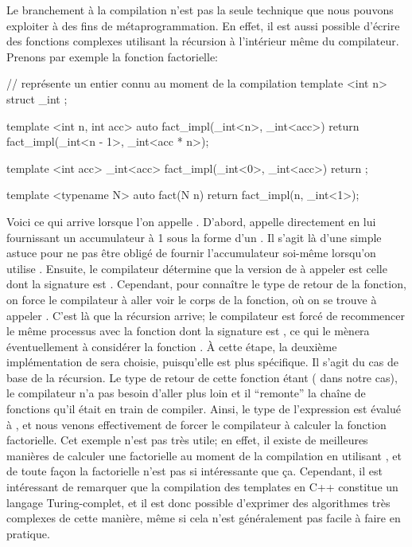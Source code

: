 Le branchement à la compilation n'est pas la seule technique que nous pouvons
exploiter à des fins de métaprogrammation. En effet, il est aussi possible
d'écrire des fonctions complexes utilisant la récursion à l'intérieur même du
compilateur. Prenons par exemple la fonction factorielle:
\begin{cpp}
    // représente un entier connu au moment de la compilation
    template <int n>
    struct _int { };

    template <int n, int acc>
    auto fact_impl(_int<n>, _int<acc>)
    { return fact_impl(_int<n - 1>{}, _int<acc * n>{}); }

    template <int acc>
    _int<acc> fact_impl(_int<0>, _int<acc>)
    { return {}; }

    template <typename N>
    auto fact(N n)
    { return fact_impl(n, _int<1>{}); }
\end{cpp}

Voici ce qui arrive lorsque l'on appelle . D'abord,
 appelle directement  en lui fournissant un
accumulateur à 1 sous la forme d'un . Il s'agit là d'une simple
astuce pour ne pas être obligé de fournir l'accumulateur soi-même lorsqu'on
utilise . Ensuite, le compilateur détermine que la version de
 à appeler est celle dont la signature est . Cependant, pour connaître le type de retour de
la fonction, on force le compilateur à aller voir le corps de la fonction, où
on se trouve à appeler . C'est
là que la récursion arrive; le compilateur est forcé de recommencer le même
processus avec la fonction dont la signature est , ce qui le mènera éventuellement à considérer la fonction
. À cette étape, la deuxième
implémentation de  sera choisie, puisqu'elle est plus
spécifique. Il s'agit du cas de base de la récursion. Le type de retour de
cette fonction étant  ( dans notre
cas), le compilateur n'a pas besoin d'aller plus loin et il ``remonte'' la
chaîne de fonctions qu'il était en train de compiler. Ainsi, le type de
l'expression  est évalué à ,
et nous venons effectivement de forcer le compilateur à calculer la fonction
factorielle. Cet exemple n'est pas très utile; en effet, il existe de
meilleures manières de calculer une factorielle au moment de la compilation en
utilisant , et de toute façon la factorielle n'est pas si
intéressante que ça. Cependant, il est intéressant de remarquer que la
compilation des templates en C++ constitue un langage Turing-complet, et il
est donc possible d'exprimer des algorithmes très complexes de cette manière,
même si cela n'est généralement pas facile à faire en pratique.


